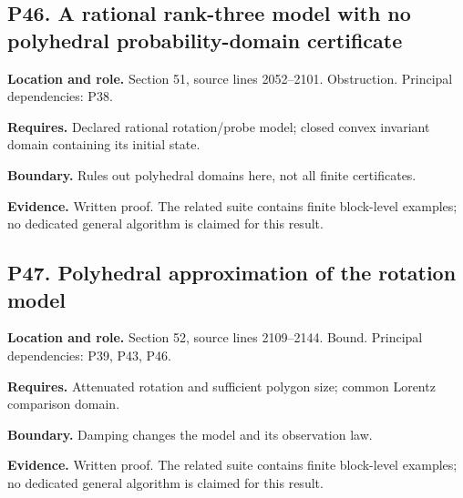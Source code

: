 \documentclass[11pt,letterpaper]{article}
\begin{document}
\par\noindent\begin{minipage}{\textwidth}
\subsection{P46. A rational rank-three model with no polyhedral
probability-domain
certificate}\label{p46.-a-rational-rank-three-model-with-no-polyhedral-probability-domain-certificate}

\textbf{Location and role.} Section 51, source lines 2052--2101.
Obstruction. Principal dependencies: P38.

\textbf{Requires.} Declared rational rotation/probe model; closed convex
invariant domain containing its initial state.

\textbf{Boundary.} Rules out polyhedral domains here, not all finite
certificates.

\textbf{Evidence.} Written proof. The related suite contains finite
block-level examples; no dedicated general algorithm is claimed for this
result.
\end{minipage}\par\medskip

\par\noindent\begin{minipage}{\textwidth}
\subsection{P47. Polyhedral approximation of the rotation
model}\label{p47.-polyhedral-approximation-of-the-rotation-model}

\textbf{Location and role.} Section 52, source lines 2109--2144. Bound.
Principal dependencies: P39, P43, P46.

\textbf{Requires.} Attenuated rotation and sufficient polygon size;
common Lorentz comparison domain.

\textbf{Boundary.} Damping changes the model and its observation law.

\textbf{Evidence.} Written proof. The related suite contains finite
block-level examples; no dedicated general algorithm is claimed for this
result.
\end{minipage}\par\medskip
\end{document}

